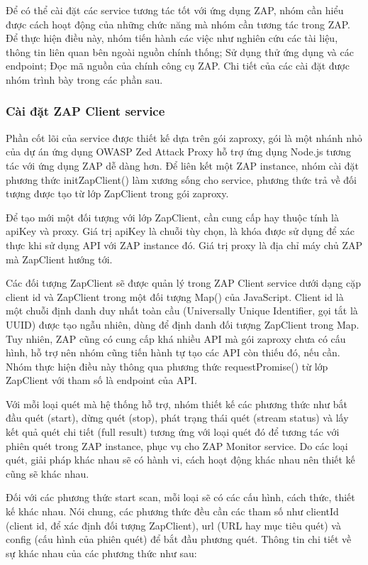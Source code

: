 Để có thể cài đặt các service tương tác tốt với ứng dụng ZAP,
nhóm cần hiểu được cách hoạt động của những chức năng mà nhóm cần tương tác trong ZAP.
Để thực hiện điều này, nhóm tiến hành các việc như nghiên cứu các tài liệu, thông tin liên quan bên ngoài nguồn chính thống;
Sử dụng thử ứng dụng và các endpoint; Đọc mã nguồn của chính công cụ ZAP.
Chi tiết của các cài đặt được nhóm trình bày trong các phần sau.

\subsubsection{Cài đặt ZAP Client service} \label{subsubsec:CaiDatZapClientService}

\tab Phần cốt lõi của service được thiết kế dựa trên gói zaproxy, gói là một nhánh nhỏ của dự án ứng dụng OWASP Zed Attack Proxy hỗ trợ ứng dụng Node.js tương tác với ứng dụng ZAP dễ dàng hơn. Để liên kết một ZAP instance, nhóm cài đặt phương thức initZapClient() làm xương sống cho service, phương thức trả về đối tượng được tạo từ lớp ZapClient trong gói zaproxy.

Để tạo mới một đối tượng với lớp ZapClient, cần cung cấp hay thuộc tính là apiKey và proxy. Giá trị apiKey là chuỗi tùy chọn, là khóa được sử dụng để xác thực khi sử dụng API với ZAP instance đó. Giá trị proxy là địa chỉ máy chủ ZAP mà ZapClient hướng tới.

Các đối tượng ZapClient sẽ được quản lý trong ZAP Client service dưới dạng cặp client id và ZapClient trong một đối tượng Map() của JavaScript. Client id là một chuỗi định danh duy nhất toàn cầu (Universally Unique Identifier, gọi tắt là UUID) được tạo ngẫu nhiên, dùng để định danh đối tượng ZapClient trong Map. Tuy nhiên, ZAP cũng có cung cấp khá nhiều API mà gói zaproxy chưa có cấu hình, hỗ trợ nên nhóm cũng tiến hành tự tạo các API còn thiếu đó, nếu cần. Nhóm thực hiện điều này thông qua phương thức requestPromise() từ lớp ZapClient với tham số là endpoint của API.

Với mỗi loại quét mà hệ thống hỗ trợ, nhóm thiết kế các phương thức như bắt đầu quét (start), dừng quét (stop), phát trạng thái quét (stream status) và lấy kết quả quét chi tiết (full result) tương ứng với loại quét đó để tương tác với phiên quét trong ZAP instance, phục vụ cho ZAP Monitor service. Do các loại quét, giải pháp khác nhau sẽ có hành vi, cách hoạt động khác nhau nên thiết kế cũng sẽ khác nhau.
\par

Đối với các phương thức start scan, mỗi loại sẽ có các cấu hình, cách thức, thiết kế khác nhau. Nói chung, các phương thức đều cần các tham số như clientId (client id, để xác định đối tượng ZapClient), url (URL hay mục tiêu quét) và config (cấu hình của phiên quét) để bắt đầu phương quét. Thông tin chi tiết về sự khác nhau của các phương thức như sau:
\par

